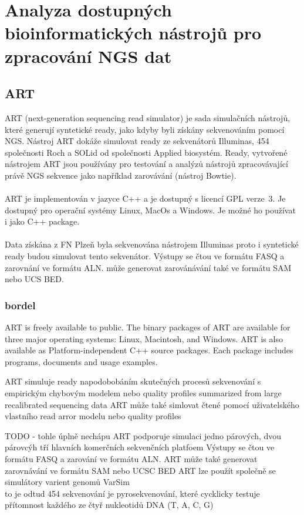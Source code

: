 \documentclass[czech,DP]{thesiskiv}
\begin{document}
\chapter{Analyza dostupných bioinformatických nástrojů pro zpracování NGS dat}

\section{ART}
ART (next-generation sequencing read simulator) je sada simulačních nástrojů, které generují syntetické ready, jako kdyby byli získány sekvenováním pomocí NGS. Nástroj ART dokáže simulovat ready ze sekvenátorů Illuminas, 454 společnosti Roch a SOLid od společnosti Applied biosystém. Ready, vytvořené nástrojem ART jsou používány pro testování a analýzů nástrojů zpracovávající právě NGS sekvence jako například zarovávání (nástroj Bowtie). 
\\
\\
ART je implementován v jazyce C++ a je dostupný s licencí GPL verze~3. Je dostupný pro operační systémy Linux, MacOs a Windows. Je možné ho používat i jako C++ package.
\\
\\
Data získána z FN Plzeň byla sekvenována nástrojem Illuminas proto i syntetické ready budou simulovat tento sekvenátor.    
 Výstupy se čtou ve formátu FASQ a zarovnání ve formátu ALN. může generovat zarovánávání také ve formátu SAM nebo UCS BED. \cite{art}

\subsection{bordel}
ART is freely available to public. The binary packages of ART are available for three major operating systems: Linux, Macintosh, and Windows. ART is also available as Platform-independent C++ source packages. Each package includes programs, documents and usage examples.

ART simuluje ready napodobobáním skutečných procesů sekvenování s empirickým chybovým modelem nebo quality profiles summarized from large recalibrated sequencing data
ART může také simlovat čtené pomocí uživatelského vlastního read arror modelu nebo quality profiles

TODO - tohle úplně nechápu ART podporuje simulaci jedno párových, dvou párovcýh tří hlavních komerčních sekvenčních platfoem 
Výstupy se čtou ve formátu FASQ a zarování ve formátu ALN. 
ART může také generovat zarovnávání ve formátu SAM nebo UCSC BED
ART lze použít společně se simulátory varient genomů VarSim 
\\
to je odtud %
454 sekvenování je pyrosekvenování, které cycklicky testuje přítomnost každého ze čtyř nukleotidů DNA (T, A, C, G)
\end{document}
